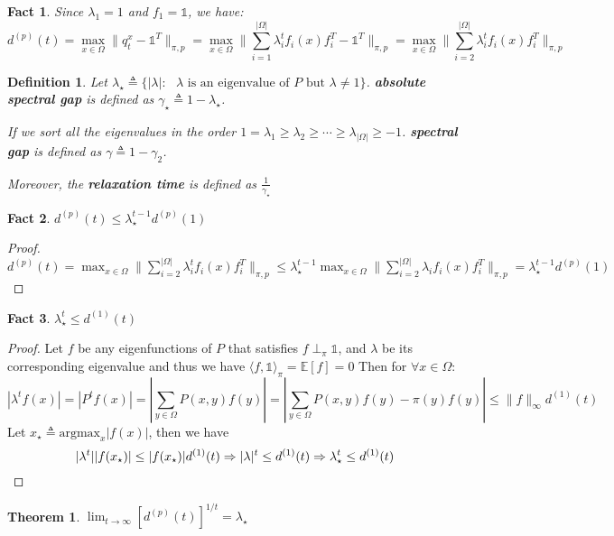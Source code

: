 \documentclass[utf8]{article}
\newtheorem{define}{Definition}[section]
\newtheorem{theorem}{Theorem}[section]
\newtheorem{fact}{Fact}[section]
\def\<{\langle}
\def\>{\rangle}
\begin{document}
\begin{fact}
  Since $\lambda_1 = 1$ and $f_1 = \mathbb{1}$, we have:
  \[d^{(p)}(t) = \max_{x\in\Omega} \parallel q_t^x - \mathbb{1}^T \parallel_{\pi, p} = \max_{x\in\Omega} \parallel \sum_{i=1}^{|\Omega|} \lambda_i^t f_i(x) f_i^T - \mathbb{1}^T \parallel_{\pi, p} = \max_{x\in\Omega} \parallel \sum_{i=2}^{|\Omega|} \lambda_i^t f_i(x) f_i^T \parallel_{\pi, p}\]
\end{fact}

\begin{define}
  Let $\lambda_\star \triangleq \{|\lambda|: \mbox{ $\lambda$ is an eigenvalue of $P$ but $\lambda \not= 1$}\}$.
  \textbf{absolute spectral gap} is defined as $\gamma_\star \triangleq 1 - \lambda_\star$.
  
  If we sort all the eigenvalues in the order $1 = \lambda_1 \geq \lambda_2 \geq \cdots \geq \lambda_{|\Omega|} \geq -1$.
  \textbf{spectral gap} is defined as $\gamma \triangleq 1 - \gamma_2$.

  Moreover, the \textbf{relaxation time} is defined as $\frac{1}{\gamma_\star}$
\end{define}
\begin{fact}
  $d^{(p)}(t) \leq \lambda_\star^{t-1} d^{(p)}(1)$
\end{fact}
\begin{proof}
  $d^{(p)}(t) =  \max_{x\in\Omega} \parallel \sum_{i=2}^{|\Omega|} \lambda_i^t f_i(x) f_i^T \parallel_{\pi, p}  \leq \lambda_\star^{t-1}\max_{x\in\Omega} \parallel \sum_{i=2}^{|\Omega|} \lambda_i f_i(x) f_i^T \parallel_{\pi, p} =\lambda_\star^{t-1} d^{(p)}(1)$
\end{proof}
\begin{fact}
  $\lambda_\star^t \leq d^{(1)}(t)$
\end{fact}
\begin{proof}
  Let $f$ be any eigenfunctions of $P$ that satisfies $f\perp_\pi \mathbb{1}$, and $\lambda$ be its corresponding eigenvalue and thus we have $\<f, \mathbb{1}\>_\pi = \mathbb{E}[f] = 0$
  Then for $\forall x\in \Omega$:
  \[|\lambda^t f(x)| = |P^tf (x)| = |\sum_{y\in\Omega} P(x, y)f(y)| = |\sum_{y\in\Omega} P(x, y)f(y) - \pi(y)f(y)| \leq \parallel f \parallel_\infty d^{(1)}(t)\]
  Let $x_\star \triangleq \mathrm{argmax}_{x} |f(x)|$, then we have
  \[|\lambda^t| |f(x_\star)| \leq |f(x_\star)| d^{(1)}(t) \Rightarrow |\lambda|^t \leq d^{(1)}(t) \Rightarrow \lambda_\star^t \leq d^{(1)}(t) \qedhere\]
\end{proof}
\begin{theorem}
  $\lim_{t\to\infty} \left[d^{(p)}(t)\right]^{1/t} = \lambda_\star$
\end{theorem}
\end{document}
